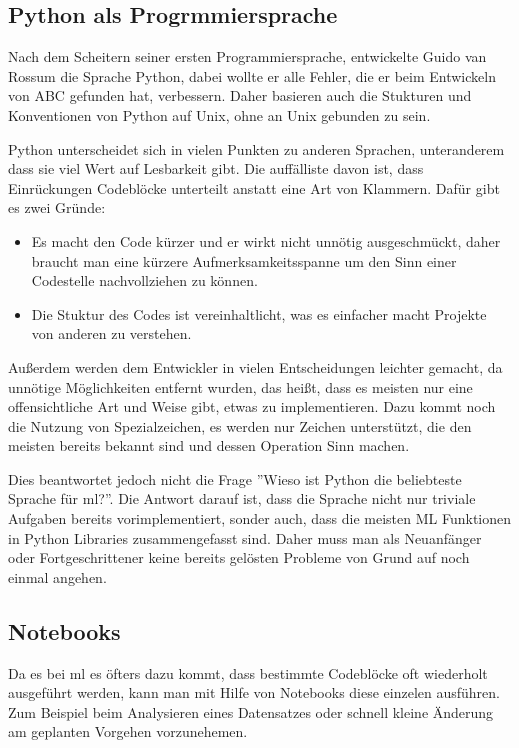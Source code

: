 \subsection{Python als Progrmmiersprache}

Nach dem Scheitern seiner ersten Programmiersprache, entwickelte Guido van Rossum die Sprache Python, dabei wollte er alle Fehler, die er beim Entwickeln von ABC gefunden hat, verbessern. Daher basieren auch die Stukturen und Konventionen von Python auf Unix, ohne an Unix gebunden zu sein.

Python unterscheidet sich in vielen Punkten zu anderen Sprachen, unteranderem dass sie viel Wert auf Lesbarkeit gibt. Die auffälliste davon ist, dass Einrückungen Codeblöcke unterteilt anstatt eine Art von Klammern. Dafür gibt es zwei Gründe:

\begin{itemize}
    \item Es macht den Code kürzer und er wirkt nicht unnötig ausgeschmückt, daher braucht man eine kürzere Aufmerksamkeitsspanne um den Sinn einer Codestelle nachvollziehen zu können.
    \item Die Stuktur des Codes ist vereinhaltlicht, was es einfacher macht Projekte von anderen zu verstehen.
\end{itemize}

Außerdem werden dem Entwickler in vielen Entscheidungen leichter gemacht, da unnötige Möglichkeiten entfernt wurden, das heißt, dass es meisten nur eine offensichtliche Art und Weise gibt, etwas zu implementieren. Dazu kommt noch die Nutzung von Spezialzeichen, es werden nur Zeichen unterstützt, die den meisten bereits bekannt sind und dessen Operation Sinn machen. \cite{PythonGVR:online}

Dies beantwortet jedoch nicht die Frage ''Wieso ist Python die beliebteste Sprache für \gls{ml}?''. Die Antwort darauf ist, dass die Sprache nicht nur triviale Aufgaben bereits vorimplementiert, sonder auch, dass die meisten ML Funktionen in Python Libraries zusammengefasst sind. Daher muss man als Neuanfänger oder Fortgeschrittener keine bereits gelösten Probleme von Grund auf noch einmal angehen.

\subsection{Notebooks}

Da es bei \gls{ml} es öfters dazu kommt, dass bestimmte Codeblöcke oft wiederholt ausgeführt werden, kann man mit Hilfe von Notebooks diese einzelen ausführen. Zum Beispiel beim Analysieren eines Datensatzes oder schnell kleine Änderung am geplanten Vorgehen vorzunehemen.

